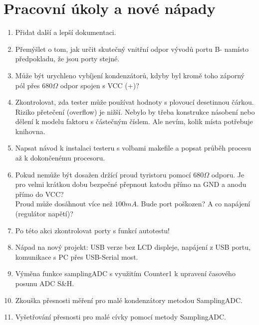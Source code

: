 \chapter{Pracovní úkoly a nové nápady}
\label{sec:todo}
\begin{enumerate}
\item Přidat další a lepší dokumentaci.
\item Přemýšlet o tom, jak určit skutečný vnitřní odpor vývodů portu B- namísto předpokladu, že jsou porty  stejné.
\item Může být urychleno vybíjení kondenzátorů, kdyby byl kromě toho záporný pól přes \(680\Omega\) odpor
spojen s VCC (+)?
\item Zkontrolovat, zda tester může používat hodnoty s plovoucí desetinnou čárkou.
Riziko přetečení (overflow) je nižší.
Nebylo by třeba konstrukce násobení nebo dělení k modelu faktoru s částečným číslem.
Ale nevím, kolik místa potřebuje knihovna.
\item Napsat návod k instalaci testeru s volbami makefile a popsat průběh procesu až k dokončenému procesoru.
\item Pokud  nemůže být dosažen držící proud tyristoru pomocí \(680\Omega\) odporu. Je pro velmi krátkou dobu bezpečné přepnout katodu přímo na GND a anodu přímo do VCC?
\\Proud může dosáhnout více než \(100mA\). Bude port poškozen? A co napájení (regulátor napětí)?
\item Po této akci zkontrolovat porty s funkcí autotestu!
\item Nápad na nový projekt: USB verze bez LCD displeje, napájení z USB portu, komunikace s PC přes USB-Serial  most.
\item Výměna funkce samplingADC s využitím Counter1 k upravení časového posunu ADC S\&H.
\item Zkouška přesnosti měření pro malé kondenzátory metodou SamplingADC.
\item Vyšetřování přesnosti pro malé cívky pomocí metody SamplingADC.
\end{enumerate}
